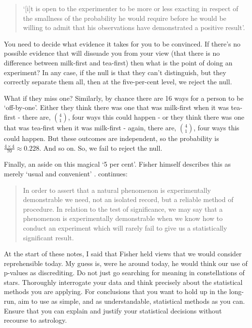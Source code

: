 \documentclass[
]{book}
\begin{document}
\begin{quote}
`{[}i{]}t is open to the experimenter to be more or less exacting in respect of the smallness of the probability he would require before he would be willing to admit that his observations have demonstrated a positive result'.
\end{quote}

You need to decide what evidence it takes for you to be convinced. If there's no possible evidence that will dissuade you from your view (that there is no difference between milk-first and tea-first) then what is the point of doing an experiment? In any case, if the null is that they can't distinguish, but they correctly separate them all, then at the five-per-cent level, we reject the null.

What if they miss one? Similarly, by chance there are 16 ways for a person to be `off-by-one'. Either they think there was one that was milk-first when it was tea-first - there are, \({4 \choose 1}\), four ways this could happen - or they think there was one that was tea-first when it was milk-first - again, there are, \({4 \choose 1}\), four ways this could happen. But these outcomes are independent, so the probability is \(\frac{4\times 4}{70} \approx 0.228\). And so on. So, we fail to reject the null.

Finally, an aside on this magical `5 per cent'. Fisher himself describes this as merely `usual and convenient' \citep[ p.15]{fisherdesignofexperiments}. \citet[p.16]{fisherdesignofexperiments} continues:

\begin{quote}
In order to assert that a natural phenomenon is experimentally demonstrable we need, not an isolated record, but a reliable method of procedure. In relation to the test of significance, we may say that a phenomenon is experimentally demonstrable when we know how to conduct an experiment which will rarely fail to give us a statistically significant result.
\end{quote}

At the start of these notes, I said that Fisher held views that we would consider reprehensible today. My guess is, were he around today, he would think our use of p-values as discrediting. Do not just go searching for meaning in constellations of stars. Thoroughly interrogate your data and think precisely about the statistical methods you are applying. For conclusions that you want to hold up in the long-run, aim to use as simple, and as understandable, statistical methods as you can. Ensure that you can explain and justify your statistical decisions without recourse to astrology.
\end{document}
